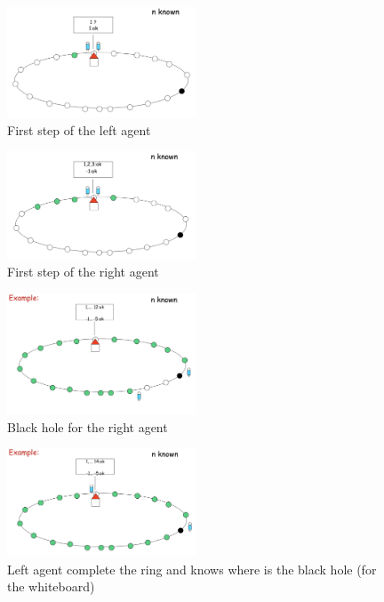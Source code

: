 \documentclass[paper=a4, fontsize=11pt]{scrartcl} %
\numberwithin{equation}{section} %
\numberwithin{figure}{section} %
\numberwithin{table}{section} %
\begin{document}
 \begin{figure}[H]
  \centering
  \includegraphics[width=0.5\textwidth]{img/ring1.png}
  \caption{First step of the left agent}
  
\end{figure} \begin{figure}[H]
  \centering
  \includegraphics[width=0.5\textwidth]{img/ring2.png}
  \caption{First step of the right agent}
  
\end{figure} \begin{figure}[H]
  \centering
  \includegraphics[width=0.5\textwidth]{img/ring3.png}
  \caption{Black hole for the right agent}
  
\end{figure} \begin{figure}[H]
  \centering
  \includegraphics[width=0.5\textwidth]{img/ring4.png}
  \caption{Left agent complete the ring and knows where is the black hole (for the whiteboard)}
  
\end{figure}
\clearpage
\end{document}
